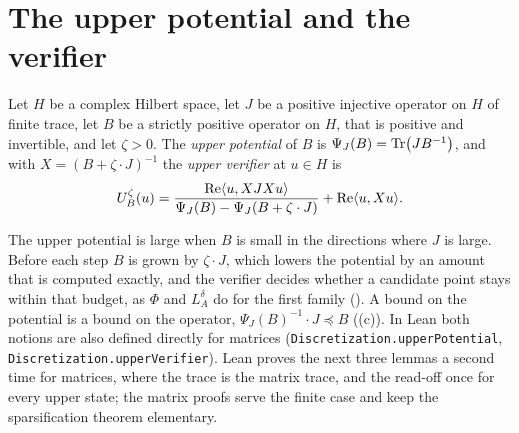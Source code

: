 \section{The upper potential and the verifier}

\begin{definition}
\label{def:upper-potential}
\leanok
{}
Let $H$ be a complex Hilbert space, let $J$ be a positive injective operator on $H$ of
finite trace, let $B$ be a strictly positive operator on $H$, that is positive and
invertible, and let $\zeta > 0$. The \emph{upper potential} of $B$ is
$\Psi_J(B) = \operatorname{Tr} \bigl( J B^{-1} \bigr)$, and with $X = (B + \zeta \cdot J)^{-1}$ the
\emph{upper verifier} at $u \in H$ is
\[
  U_B^{\zeta}(u)
    = \frac{\operatorname{Re} \langle u, X J X u \rangle}
           {\Psi_J(B) - \Psi_J(B + \zeta \cdot J)} + \operatorname{Re} \langle u, X u \rangle .
\]
\end{definition}

The upper potential is large when $B$ is small in the directions where $J$ is large. Before
each step $B$ is grown by $\zeta \cdot J$, which lowers the potential by an amount that is
computed exactly, and the verifier decides whether a candidate point stays within that
budget, as $\Phi$ and $L_A^{\delta}$ do for the first family ().
A bound on the potential is a bound on the operator, $\Psi_J(B)^{-1} \cdot J \preceq B$
((c)). In Lean both notions are also defined directly for
matrices (\texttt{Discretization.upperPotential}, \texttt{Discretization.upperVerifier}).
Lean proves the next three lemmas a second time for matrices, where the trace is the matrix
trace, and the read-off  once for every upper state; the
matrix proofs serve the finite case and keep the sparsification theorem elementary.


